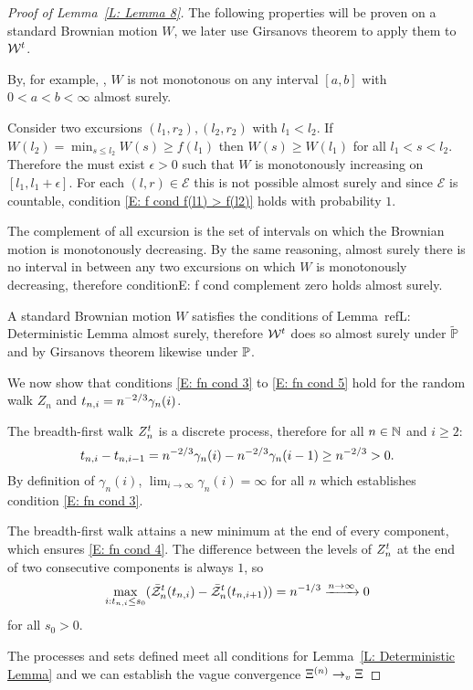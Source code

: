 \begin{proof}[Proof of Lemma~\ref{L: Lemma 8}]
	The following properties will be proven on a standard Brownian motion $W$,
	we later use Girsanovs theorem to apply them to $\mathcal{W}^t$.
	
	By, for example, \cite[Theorem 1.22]{Peres2008},
	$W$ is not monotonous on any interval $[a,b]$ with $0 < a < b < \infty$ almost surely.
	
	Consider two excursions $(l_1, r_2), (l_2, r_2)$ with $l_1 < l_2$.
	If $W(l_2) = \min_{s \leq l_2} W(s) \geq f(l_1)$ then $W(s) \geq W(l_1)$ for all $l_1 < s < l_2$.
	Therefore the must exist $\epsilon>0$ such that $W$ is monotonously increasing on $[l_1, l_1 + \epsilon]$.
	For each $(l,r) \in \mathcal{E}$ this is not possible almost surely
	and since $\mathcal{E}$ is countable,
	condition \eqref{E: f cond f(l1) > f(l2)} holds with probability $1$.
	
	The complement of all excursion is the set of intervals
	on which the Brownian motion is monotonously decreasing.
	By the same reasoning, almost surely there is no interval in between any two excursions on which $W$ is monotonously decreasing,
	therefore condition{E: f cond complement zero} holds almost surely.
	
	A standard Brownian motion $W$ satisfies the conditions of Lemma~ref{L: Deterministic Lemma} almost surely,
	therefore $\mathcal{W}^t$ does so almost surely under $\tilde{\mathbb{P}}$
	and by Girsanovs theorem likewise under $\mathbb{P}$.  

	
	We now show that conditions 
	\eqref{E: fn cond 3} to \eqref{E: fn cond 5}
	hold for the random walk $Z_n$ and $t_{n,i} = n^{-2 / 3} \gamma_n(i)$.
	
	The breadth-first walk $Z_n^t$ is a discrete process, therefore for all $n \in \mathbb{N}$ and $i \geq 2$:
	\begin{equation}
		t_{n, i} - t_{n, i-1} = n^{-2 / 3}\gamma_n(i) - n^{-2 / 3}\gamma_n(i-1) \geq n^{-2 / 3} > 0.
	\end{equation}
	By definition of $\gamma_n(i)$,
	$\lim_{i \rightarrow \infty} \gamma_n(i) = \infty$ for all $n$
	which establishes condition \eqref{E: fn cond 3}.
	
	The breadth-first walk attains a new minimum at the end of every component,
	which ensures \eqref{E: fn cond 4}.
	The difference between the levels of $Z_n^t$ at the end of two consecutive components is always $1$,
	so 
	\begin{equation}
		\max_{i: t_{n, i} \leq s_0}(\bar{\mathcal{Z}}^t_n(t_{n, i}) - \bar{\mathcal{Z}}^t_n(t_{n, i+1})) = n^{-1 / 3} \xrightarrow{n \rightarrow \infty} 0
	\end{equation}
	for all $s_0 > 0$.
	
	The processes and sets defined meet all conditions for Lemma~\ref{L: Deterministic Lemma}
	and we can establish the vague convergence $ \Xi^{(n)} \rightarrow_v \Xi $
	
	
\end{proof}


